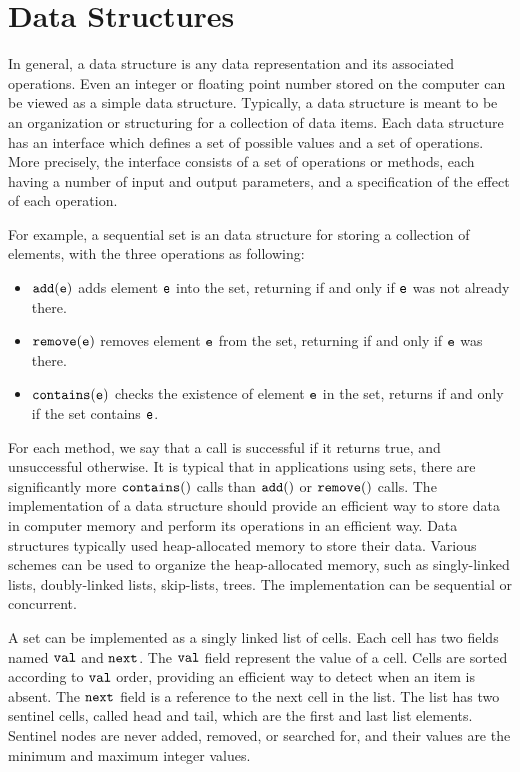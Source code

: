  
\chapter{Data Structures}
In general, a data structure is any data representation and its
associated operations. Even an integer or floating point number stored on the computer can be viewed as a simple data structure. Typically, a data structure is meant to be an organization or structuring for a collection of data items. 
 Each data structure has an interface which defines a set of possible values and a set of operations. More precisely, the interface consists of a set of operations or methods, each having a number of input and output parameters, and a specification of the effect of each operation. 

For example,  a sequential set is an data structure for storing a collection of elements, with the three operations as following: 
\begin{itemize}
\item $\tt add(e)$ adds element $\tt e$ into the set, returning \true\; if and only if $\tt e$ was not
already there. 
\item $\tt remove(e)$ removes element $\tt e$ from the set, returning \true\; if and only if
$\tt e$ was there. 
\item $\tt contains(e)$ checks the existence of element $\tt e$ in the set, returns \true\; if and only if the set contains $\tt e$. 
\end{itemize}
For each method, we say that a call is successful if it returns true, and unsuccessful
otherwise. It is typical that in applications using sets, there are significantly more
$\tt contains()$ calls than $\tt add()$ or $\tt remove()$ calls.
The implementation of a data structure should provide
an efficient way to store data in computer memory and perform its operations
in an efficient way. Data structures
typically used heap-allocated memory to store their data. Various schemes
can be used to organize the heap-allocated memory, such as singly-linked lists,
doubly-linked lists, skip-lists, trees. The implementation
can be sequential or concurrent.

A set can be implemented as a singly linked list of cells. Each cell has two fields named $\tt val$ and $\tt next$. The $\tt val$ field represent the value of a cell. Cells are sorted according to $\tt val$ order, providing an efficient way to detect when an item is absent. The $\tt next$ field is a reference to
the next cell in the list. The list has two sentinel cells, called head and tail, which are the first and last list elements. Sentinel nodes are never added, removed, or searched for, and their values are the minimum and maximum integer values.



